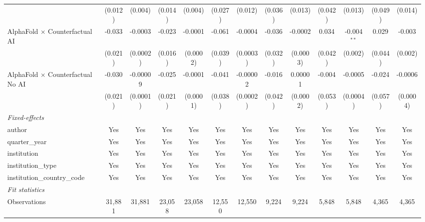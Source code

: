 \begin{tabular}{lcccccccccccc}
                                            & (0.012)      & (0.004)  & (0.014)     & (0.004)  & (0.027) & (0.012)  & (0.036) & (0.013)      & (0.042) & (0.013)       & (0.049) & (0.014)\\   
   AlphaFold $\times$ Counterfactual AI     & -0.033       & -0.0003  & -0.023      & -0.0001  & -0.061  & -0.0004  & -0.036  & -0.0002      & 0.034   & -0.004$^{**}$ & 0.029   & -0.003\\   
                                            & (0.021)      & (0.0002) & (0.016)     & (0.0002) & (0.039) & (0.0003) & (0.032) & (0.0003)     & (0.042) & (0.002)       & (0.044) & (0.002)\\   
   AlphaFold $\times$ Counterfactual No AI  & -0.030       & -0.00009 & -0.025      & -0.0001  & -0.041  & -0.00002 & -0.016  & 0.00001      & -0.004  & -0.0005       & -0.024  & -0.0006\\   
                                            & (0.021)      & (0.0001) & (0.021)     & (0.0001) & (0.038) & (0.0002) & (0.042) & (0.0002)     & (0.053) & (0.0004)      & (0.057) & (0.0004)\\   
   \midrule
   \emph{Fixed-effects}\\
   author                                   & Yes          & Yes      & Yes         & Yes      & Yes     & Yes      & Yes     & Yes          & Yes     & Yes           & Yes     & Yes\\  
   quarter\_year                            & Yes          & Yes      & Yes         & Yes      & Yes     & Yes      & Yes     & Yes          & Yes     & Yes           & Yes     & Yes\\  
   institution                              & Yes          & Yes      & Yes         & Yes      & Yes     & Yes      & Yes     & Yes          & Yes     & Yes           & Yes     & Yes\\  
   institution\_type                        & Yes          & Yes      & Yes         & Yes      & Yes     & Yes      & Yes     & Yes          & Yes     & Yes           & Yes     & Yes\\  
   institution\_country\_code               & Yes          & Yes      & Yes         & Yes      & Yes     & Yes      & Yes     & Yes          & Yes     & Yes           & Yes     & Yes\\  
   \midrule
   \emph{Fit statistics}\\
   Observations                             & 31,881       & 31,881   & 23,058      & 23,058   & 12,550  & 12,550   & 9,224   & 9,224        & 5,848   & 5,848         & 4,365   & 4,365\\  

\end{tabular}
